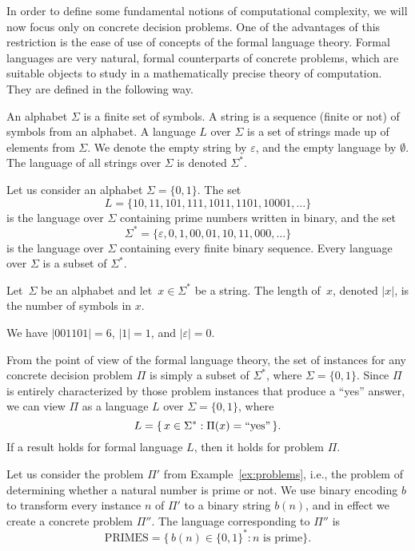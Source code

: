 In order to define some fundamental notions of computational complexity, we will now focus only on concrete decision problems.
One of the advantages of this restriction is the ease of use of concepts of the formal language theory.
Formal languages are very natural, formal counterparts of concrete problems, which are suitable objects to study in a mathematically precise theory of computation.
They are defined in the following way.

\begin{definition}
    An alphabet $\Sigma$ is a finite set of symbols.
	A string is a sequence (finite or not) of symbols from an alphabet.
	A language $L$ over $\Sigma$ is a set of strings made up of elements from $\Sigma$.
	We denote the empty string by $\varepsilon$, and the empty language by $\emptyset$.
	The language of all strings over $\Sigma$ is denoted $\Sigma^*$.
\end{definition}

\begin{Example}
    Let us consider an alphabet $\Sigma=\{0,1\}$.
	The set
	\[
	    L = \{10,11,101,111,1011,1101,10001,\dots\}
	\]
	is the language over $\Sigma$ containing prime numbers written in binary, and the set
	\[
	    \Sigma^* = \{\varepsilon,0,1,00,01,10,11,000,\dots\}
	\]
	is the language over $\Sigma$ containing every finite binary sequence.
	Every language over $\Sigma$ is a subset of $\Sigma^*$.
\end{Example}

\begin{definition}
    Let \,$\Sigma$ be an alphabet and let \,$x\in\Sigma^*$ be a string.
	The length of \,$x$, denoted $|x|$, is the number of symbols in $x$.
\end{definition}

\begin{Example}
	We have $|001101|=6$, $|1|=1$, and $|\varepsilon|=0$.
\end{Example}

From the point of view of the formal language theory, the set of instances for any concrete decision problem $\Pi$ is simply a subset of $\Sigma^*$, where $\Sigma=\{0,1\}$.
Since $\Pi$ is entirely characterized by those problem instances that produce a ``yes'' answer, we can view $\Pi$ as a language $L$ over $\Sigma=\{0,1\}$, where
\[
    L = \{\,x\in\Sigma^*:\Pi(x)=\textnormal{``yes''}\,\}.
\]
If a result holds for formal language $L$, then it holds for problem $\Pi$.

\begin{Example} \label{ex:primes}
	Let us consider the problem $\Pi'$ from Example~\ref{ex:problems}, i.e., the problem of determining whether a natural number is prime or not.
	We use binary encoding $\mathit{b}$ to transform every instance $n$ of $\Pi'$ to a binary string $\mathit{b}(n)$, and in effect we create a concrete problem $\Pi''$.
	The language corresponding to $\Pi''$ is
    \[
	    \text{PRIMES} = \{\,\mathit{b}(n)\in\{0,1\}^*:\text{$n$ is prime}\}.
	\]
\vskip-8mm
\end{Example}

